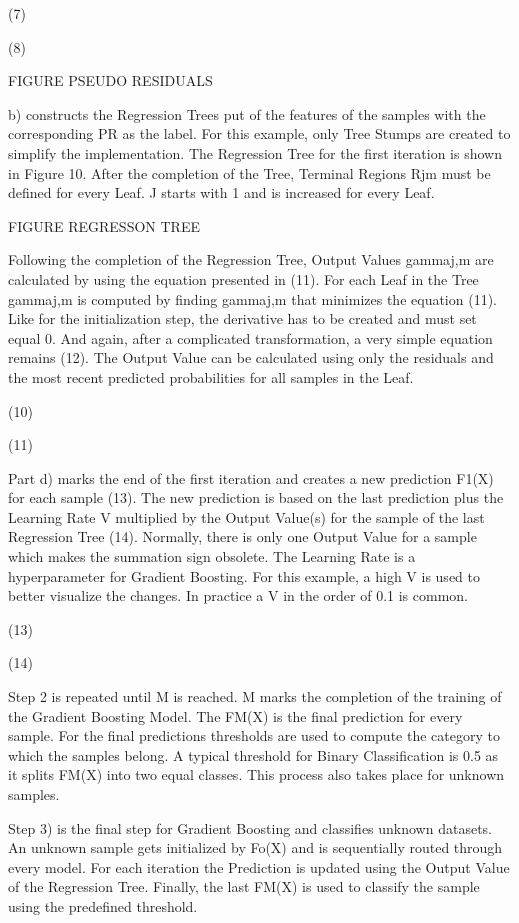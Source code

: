 (7)

(8)

FIGURE PSEUDO RESIDUALS 

b) constructs the Regression Trees put of the features of the samples with the corresponding 
PR as the label. For this example, only Tree Stumps are created to simplify the implementation. 
The Regression Tree for the first iteration is shown in Figure 10. After the completion of the 
Tree, Terminal Regions Rjm must be defined for every Leaf. J starts with 1 and is increased for 
every Leaf. 

FIGURE REGRESSON TREE 

Following the completion of the Regression Tree, Output Values gammaj,m are calculated by using 
the equation presented in (11). For each Leaf in the Tree gammaj,m is computed by finding 
gammaj,m that minimizes the equation (11). Like for the initialization step, the derivative has 
to be created and must set equal 0. And again, after a complicated transformation, a very simple 
equation remains (12). The Output Value can be calculated using only the residuals and the most 
recent predicted probabilities for all samples in the Leaf. 

(10)

(11)

Part d) marks the end of the first iteration and creates a new prediction F1(X) for each sample 
(13). The new prediction is based on the last prediction plus the Learning Rate V multiplied by 
the Output Value(s) for the sample of the last Regression Tree (14). Normally, there is only one 
Output Value for a sample which makes the summation sign obsolete. The Learning Rate is a 
hyperparameter for Gradient Boosting. For this example, a high V is used to better visualize 
the changes. In practice a V in the order of 0.1 is common. 

(13)

(14)

Step 2 is repeated until M is reached. M marks the completion of the training of the Gradient 
Boosting Model. The FM(X) is the final prediction for every sample. For the final predictions 
thresholds are used to compute the category to which the samples belong. A typical threshold 
for Binary Classification is 0.5 as it splits FM(X) into two equal classes. This process also 
takes place for unknown samples. 

Step 3) is the final step for Gradient Boosting and classifies unknown datasets. An unknown sample gets 
initialized by Fo(X) and is sequentially routed through every model. For each iteration the 
Prediction is updated using the Output Value of the Regression Tree. Finally, the last FM(X) 
is used to classify the sample using the predefined threshold. 